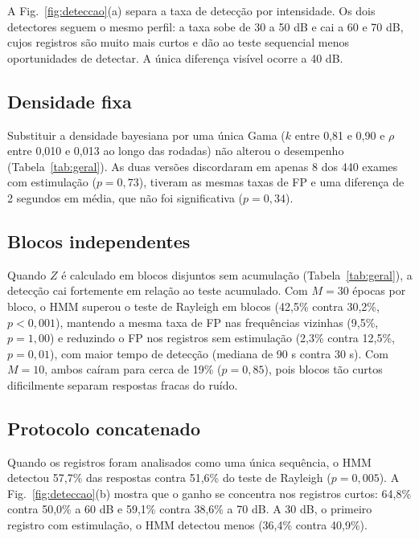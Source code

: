 \documentclass[conference]{IEEEtran}
\begin{document}
A Fig.~\ref{fig:deteccao}(a) separa a taxa de detecção por intensidade. Os dois detectores seguem o mesmo perfil: a taxa sobe de 30 a 50 dB e cai a 60 e 70 dB, cujos registros são muito mais curtos e dão ao teste sequencial menos oportunidades de detectar. A única diferença visível ocorre a 40 dB.


\subsection{Densidade fixa}

Substituir a densidade bayesiana por uma única Gama ($k$ entre 0,81 e 0,90 e $\rho$ entre 0,010 e 0,013 ao longo das rodadas) não alterou o desempenho (Tabela~\ref{tab:geral}). As duas versões discordaram em apenas 8 dos 440 exames com estimulação ($p=0{,}73$), tiveram as mesmas taxas de FP e uma diferença  de 2 segundos em média, que não foi significativa ($p=0{,}34$).

\subsection{Blocos independentes}

Quando $Z$ é calculado em blocos disjuntos sem acumulação (Tabela~\ref{tab:geral}), a detecção cai fortemente em relação ao teste acumulado. Com $M=30$ épocas por bloco, o HMM superou o teste de Rayleigh em blocos (42,5\% contra 30,2\%, $p<0{,}001$), mantendo a mesma taxa de FP nas frequências vizinhas (9,5\%, $p=1{,}00$) e reduzindo o FP nos registros sem estimulação (2,3\% contra 12,5\%, $p=0{,}01$), com maior tempo de detecção (mediana de 90 s contra 30 s). Com $M=10$, ambos caíram para cerca de 19\% ($p=0{,}85$), pois blocos tão curtos dificilmente separam respostas fracas do ruído.

\subsection{Protocolo concatenado}

Quando os registros foram analisados como uma única sequência, o HMM detectou 57,7\% das respostas contra 51,6\% do teste de Rayleigh ($p=0{,}005$). A Fig.~\ref{fig:deteccao}(b) mostra que o ganho se concentra nos registros curtos: 64,8\% contra 50,0\% a 60 dB e 59,1\% contra 38,6\% a 70 dB. A 30 dB, o primeiro registro com estimulação, o HMM detectou menos (36,4\% contra 40,9\%).
\end{document}
